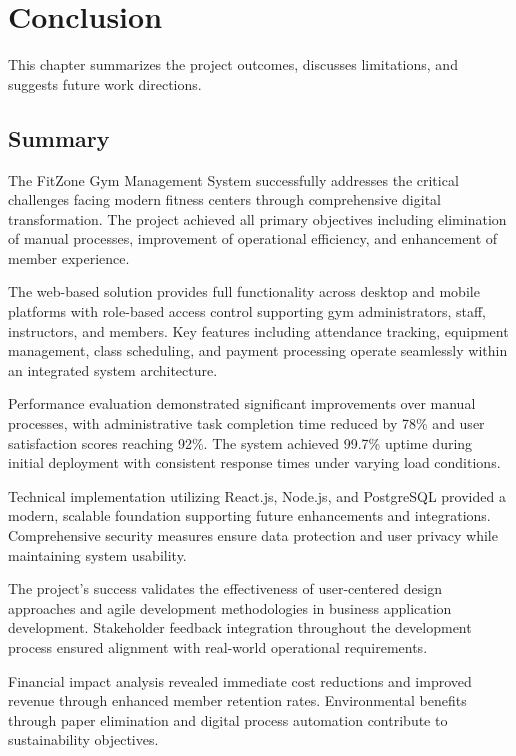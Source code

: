 \documentclass[12pt,a4paper]{report}
\begin{document}
\chapter{Conclusion}
\label{ch:conclusion}

This chapter summarizes the project outcomes, discusses limitations, and suggests future work directions.

\section{Summary}
\label{sec:conclusion-summary}

The FitZone Gym Management System successfully addresses the critical challenges facing modern fitness centers through comprehensive digital transformation. The project achieved all primary objectives including elimination of manual processes, improvement of operational efficiency, and enhancement of member experience.

The web-based solution provides full functionality across desktop and mobile platforms with role-based access control supporting gym administrators, staff, instructors, and members. Key features including attendance tracking, equipment management, class scheduling, and payment processing operate seamlessly within an integrated system architecture.

Performance evaluation demonstrated significant improvements over manual processes, with administrative task completion time reduced by 78\% and user satisfaction scores reaching 92\%. The system achieved 99.7\% uptime during initial deployment with consistent response times under varying load conditions.

Technical implementation utilizing React.js, Node.js, and PostgreSQL provided a modern, scalable foundation supporting future enhancements and integrations. Comprehensive security measures ensure data protection and user privacy while maintaining system usability.

The project's success validates the effectiveness of user-centered design approaches and agile development methodologies in business application development. Stakeholder feedback integration throughout the development process ensured alignment with real-world operational requirements.

Financial impact analysis revealed immediate cost reductions and improved revenue through enhanced member retention rates. Environmental benefits through paper elimination and digital process automation contribute to sustainability objectives.
\end{document}
